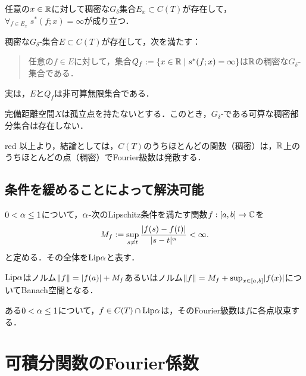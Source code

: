 \documentclass[uplatex,dvipdfmx]{jsreport}
\begin{document}
\begin{proposition}
    任意の$x\in\mathbb{R}$に対して稠密な$G_\delta$集合$E_x\subset C(T)$が存在して，$\forall_{f\in E_x}\;s^*(f;x)=\infty$が成り立つ．
\end{proposition}

\begin{theorem}
    稠密な$G_\delta$-集合$E\subset C(T)$が存在して，次を満たす：
    \begin{quotation}
        任意の$f\in E$に対して，集合$Q_f:=\left\{x\in\mathbb{R}\mid s^*(f;x)=\infty\right\}$は$\mathbb{R}$の稠密な$G_\delta$-集合である．
    \end{quotation}
\end{theorem}

実は，$E$と$Q_f$は非可算無限集合である．

\begin{proposition}
    完備距離空間$X$は孤立点を持たないとする．このとき，$G_\delta$-である可算な稠密部分集合は存在しない．
\end{proposition}

\begin{tbox}{red}{}
    以上より，結論としては，$C(T)$のうちほとんどの関数（稠密）は，$\mathbb{R}$上のうちほとんどの点（稠密）でFourier級数は発散する．
\end{tbox}

\subsection{条件を緩めることによって解決可能}

\begin{definition}
    $0<\alpha\le 1$について，$\alpha$-次のLipschitz条件を満たす関数$f:[a,b]\to\mathbb{C}$を
    \[M_f:=\sup_{s\ne t}\frac{\lvert f(s)-f(t)\rvert}{\lvert s-t\rvert^\alpha}<\infty.\]
    と定める．その全体を$\mathrm{Lip}\alpha$と表す．
\end{definition}

\begin{proposition}
    $\mathrm{Lip}\alpha$はノルム$\|f\|=\lvert f(a)\rvert+M_f$あるいはノルム$\|f\|=M_f+\sup_{x\in[a,b]}\lvert f(x)\rvert$についてBanach空間となる．
\end{proposition}

\begin{proposition}
    ある$0<\alpha\le 1$について，$f\in C(T)\cap\mathrm{Lip}\alpha$は，そのFourier級数は$f$に各点収束する．
\end{proposition}

\section{可積分関数のFourier係数}
\end{document}

